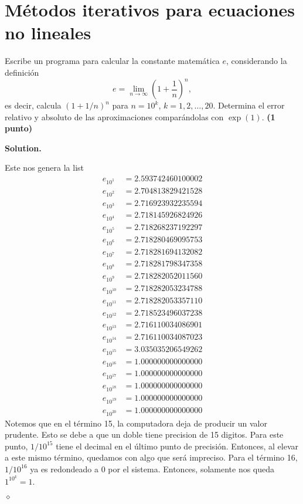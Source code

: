\documentclass{article}
\theoremstyle{problemstyle}
\newenvironment{solution}{%
  \begin{mdframed}[linewidth=0.8pt,linecolor=Gray,backgroundcolor=Gray!5,roundcorner=5pt]%
  \noindent\textbf{Solution.}%
}{%
\hfill $ \diamond $ 
  \end{mdframed}%
}
\begin{document}
\section*{M\'etodos iterativos para ecuaciones no lineales}\label{chap:m_etodos_iterativos_para_ecuaciones_no_lineales} %

\begin{problem}
Escribe un programa para calcular la constante matem\'atica $ e $, considerando la definici\'on
\[
	e = \lim_{n\to\infty} \left(1+\frac{1}{n}\right)^{n},
\]
es decir, calcula $ (1+1/n)^n $ para $ n = 10^k $, $ k = 1, 2,\dots, 20. $ Determina el error relativo y absoluto de las aproximaciones compar\'andolas con $ \exp(1) $. \textbf{(1 punto)}
\end{problem}
\begin{solution}
	

	Este nos genera la list
	\begin{align*}
		e_{10^{1}}  & = 2.593742460100002 \\
		e_{10^{2}}  & = 2.704813829421528 \\
		e_{10^{3}}  & = 2.716923932235594 \\
		e_{10^{4}}  & = 2.718145926824926 \\
		e_{10^{5}}  & = 2.718268237192297 \\
		e_{10^{6}}  & = 2.718280469095753 \\
		e_{10^{7}}  & = 2.718281694132082 \\
		e_{10^{8}}  & = 2.718281798347358 \\
		e_{10^{9}}  & = 2.718282052011560 \\
		e_{10^{10}} & = 2.718282053234788 \\
		e_{10^{11}} & = 2.718282053357110 \\
		e_{10^{12}} & = 2.718523496037238 \\
		e_{10^{13}} & = 2.716110034086901 \\
		e_{10^{14}} & = 2.716110034087023 \\
		e_{10^{15}} & = 3.035035206549262 \\
		e_{10^{16}} & = 1.000000000000000 \\
		e_{10^{17}} & = 1.000000000000000 \\
		e_{10^{18}} & = 1.000000000000000 \\
		e_{10^{19}} & = 1.000000000000000 \\
		e_{10^{20}} & = 1.000000000000000
	\end{align*}
	Notemos que en el t\'ermino 15, la computadora deja de producir un valor prudente. Esto se debe a que un doble tiene precision de 15 digitos. Para este punto, $1/10^{15}$ tiene el decimal en el \'ultimo punto de precisi\'on. Entonces, al elevar a este mismo t\'ermino, quedamos con algo que ser\'a impreciso. Para el t\'ermino 16, $1/10^{16}$ ya es redondeado a 0 por el sistema. Entonces, solamente nos queda $ 1^{10^k} = 1 $.


\end{solution}
\end{document}
